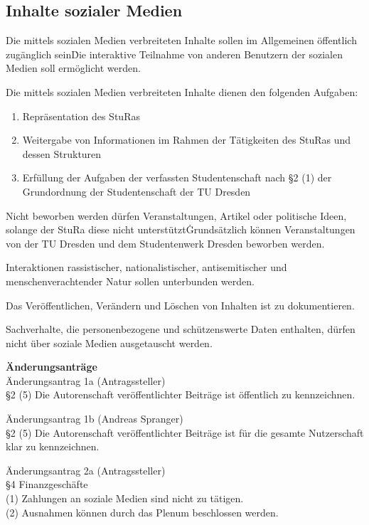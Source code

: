 \begin{multicols}{2}
\section {Inhalte sozialer Medien}
\Abs \Satz Die mittels sozialen Medien verbreiteten Inhalte sollen im Allgemeinen öffentlich zugänglich sein\. Die interaktive Teilnahme von anderen Benutzern der sozialen Medien soll ermöglicht werden.

\Abs \Satz Die mittels sozialen Medien verbreiteten Inhalte dienen den folgenden Aufgaben:
\begin{enumerate}
\item Repräsentation des StuRas
\item Weitergabe von Informationen im Rahmen der Tätigkeiten des StuRas und dessen Strukturen
\item Erfüllung der Aufgaben der verfassten Studentenschaft nach §2 (1) der Grundordnung der Studentenschaft der TU Dresden
\end {enumerate}
\Abs \Satz Nicht beworben werden dürfen Veranstaltungen, Artikel oder politische Ideen, solange der StuRa diese nicht unterstützt\. Grundsätzlich können Veranstaltungen von der TU Dresden und dem Studentenwerk Dresden beworben werden.

\Abs \Satz Interaktionen rassistischer, nationalistischer, antisemitischer und menschenverachtender Natur sollen unterbunden werden. 

\Abs \Satz Das Veröffentlichen, Verändern und Löschen von Inhalten ist zu dokumentieren.

\Abs \Satz Sachverhalte, die personenbezogene und schützenswerte Daten enthalten, dürfen nicht über soziale Medien ausgetauscht werden.

\end{multicols}

\textbf{Änderungsanträge}\\
Änderungsantrag 1a (Antragssteller)\\
§2 (5) Die Autorenschaft veröffentlichter Beiträge ist öffentlich zu kennzeichnen.

Änderungsantrag 1b (Andreas Spranger)\\
§2 (5) Die Autorenschaft veröffentlichter Beiträge ist für die gesamte Nutzerschaft klar zu kennzeichnen.

Änderungsantrag 2a (Antragssteller)\\
§4 Finanzgeschäfte\\
(1) Zahlungen an soziale Medien sind nicht zu tätigen.\\
(2) Ausnahmen können durch das Plenum beschlossen werden.

